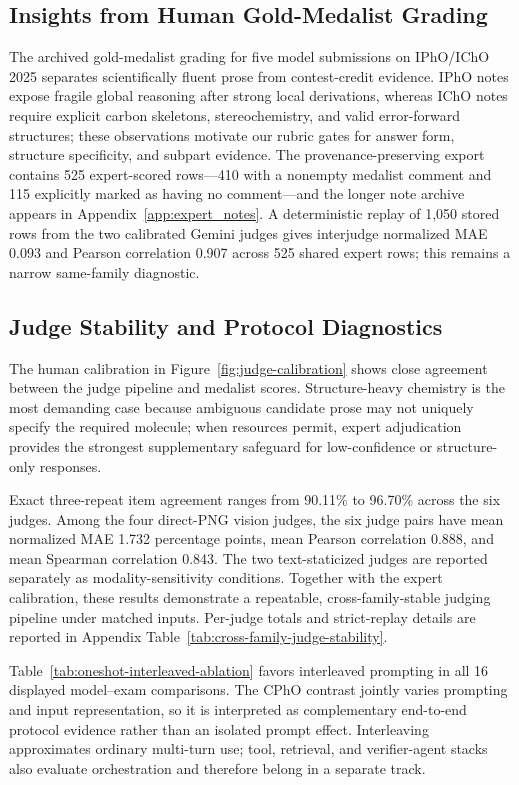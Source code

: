 \documentclass[11pt]{article}
\begin{document}
\subsection{Insights from Human Gold-Medalist Grading}
\label{sec:expert-insights}
The archived gold-medalist grading for five model submissions on IPhO/IChO 2025 separates scientifically fluent prose from contest-credit evidence.
IPhO notes expose fragile global reasoning after strong local derivations, whereas IChO notes require explicit carbon skeletons, stereochemistry, and valid error-forward structures; these observations motivate our rubric gates for answer form, structure specificity, and subpart evidence.
The provenance-preserving export contains 525 expert-scored rows---410 with a nonempty medalist comment and 115 explicitly marked as having no comment---and the longer note archive appears in Appendix~\ref{app:expert_notes}.
A deterministic replay of 1,050 stored rows from the two calibrated Gemini judges gives interjudge normalized MAE 0.093 and Pearson correlation 0.907 across 525 shared expert rows; this remains a narrow same-family diagnostic.

\subsection{Judge Stability and Protocol Diagnostics}
The human calibration in Figure~\ref{fig:judge-calibration} shows close agreement between the judge pipeline and medalist scores. Structure-heavy chemistry is the most demanding case because ambiguous candidate prose may not uniquely specify the required molecule; when resources permit, expert adjudication provides the strongest supplementary safeguard for low-confidence or structure-only responses.

Exact three-repeat item agreement ranges from 90.11\% to 96.70\% across the six judges. Among the four direct-PNG vision judges, the six judge pairs have mean normalized MAE 1.732 percentage points, mean Pearson correlation 0.888, and mean Spearman correlation 0.843. The two text-staticized judges are reported separately as modality-sensitivity conditions. Together with the expert calibration, these results demonstrate a repeatable, cross-family-stable judging pipeline under matched inputs. Per-judge totals and strict-replay details are reported in Appendix Table~\ref{tab:cross-family-judge-stability}.

Table~\ref{tab:oneshot-interleaved-ablation} favors interleaved prompting in all 16 displayed model--exam comparisons. The CPhO contrast jointly varies prompting and input representation, so it is interpreted as complementary end-to-end protocol evidence rather than an isolated prompt effect.
Interleaving approximates ordinary multi-turn use; tool, retrieval, and verifier-agent stacks also evaluate orchestration and therefore belong in a separate track.
\end{document}
